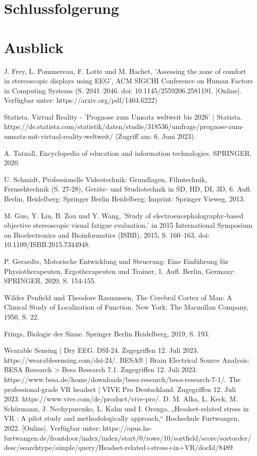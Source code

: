\documentclass[conference]{IEEEtran}
\begin{document}
\section{Schlussfolgerung}

\section{Ausblick}


\newpage

\begin{thebibliography}{00}
 J. Frey, L. Pommereau, F. Lotte und M. Hachet, 'Assessing the zone of comfort in stereoscopic displays using EEG', ACM SIGCHI Conference on Human Factors in Computing Systems (S. 2041–2046. doi: 10.1145/2559206.2581191. [Online]. Verfügbar unter: https://arxiv.org/pdf/1404.6222)

 Statista. Virtual Reality - 'Prognose zum Umsatz weltweit bis 2026' | Statista. https://de.statista.com/statistik/daten/studie/318536/umfrage/prognose-zum-umsatz-mit-virtual-reality-weltweit/ (Zugriff am: 6. Juni 2023).

 A. Tatnall, Encyclopedia of education and information technologies. SPRINGER, 2020.

 U. Schmidt, Professionelle Videotechnik: Grundlagen, Filmtechnik, Fernsehtechnik (S. 27-28), Geräte- und Studiotechnik in SD, HD, DI, 3D, 6. Aufl. Berlin, Heidelberg: Springer Berlin Heidelberg; Imprint: Springer Vieweg, 2013.

 M. Guo, Y. Liu, B. Zou und Y. Wang, 'Study of electroencephalography-based objective stereoscopic visual fatigue evaluation,' in 2015 International Symposium on Bioelectronics and Bioinformatics (ISBB), 2015, S. 160–163, doi: 10.1109/ISBB.2015.7344948.

 P. Geraedts, Motorische Entwicklung und Steuerung: Eine Einführung für Physiotherapeuten, Ergotherapeuten und Trainer, 1. Aufl. Berlin, Germany: SPRINGER, 2020, S. 154-155.

 Wilder Penfield und Theodore Rasmussen, The Cerebral Cortex of Man: A Clinical Study of Localization of Function. New York: The Macmillan Company, 1950, S. 22.

 Frings, Biologie der Sinne. Springer Berlin Heidelberg, 2019, S. 193.

Wearable Sensing | Dry EEG. DSI-24. Zugegriffen 12. Juli 2023. https://wearablesensing.com/dsi-24/.
BESA® | Brain Electrical Source Analysis: BESA Research > Besa Research 7.1. Zugegriffen 12. Juli 2023. https://www.besa.de/home/downloads/besa-research/besa-research-7-1/.
The professional-grade VR headset | VIVE Pro Deutschland. Zugegriffen 12. Juli 2023. https://www.vive.com/de/product/vive-pro/.
D. M. Alka, L. Keck, M. Schürmann, J. Nechypurenko, L. Kahn und I. Orengo, „Headset-related stress in VR : A pilot study and methodologically approach,“ Hochschule Furtwangen, 2022. [Online]. Verfügbar unter: https://opus.hs-furtwangen.de/frontdoor/index/index/start/0/rows/10/sortfield/score/sortorder/desc/searchtype/simple/query/Headset-related+stress+in+VR/docId/8489

\end{thebibliography}
\end{document}
